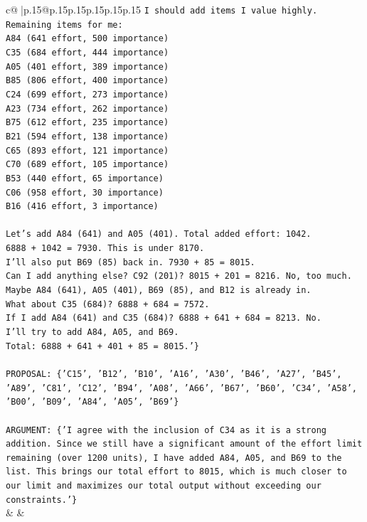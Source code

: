 \documentclass{article}
\begin{document}
{\begin{supertabular}{c@{$\;$}|p{.15\linewidth}@{}p{.15\linewidth}p{.15\linewidth}p{.15\linewidth}p{.15\linewidth}p{.15\linewidth}}
{{{\texttt{I should add items I value highly.} \\
\texttt{Remaining items for me:} \\
\texttt{A84 (641 effort, 500 importance)} \\
\texttt{C35 (684 effort, 444 importance)} \\
\texttt{A05 (401 effort, 389 importance)} \\
\texttt{B85 (806 effort, 400 importance)} \\
\texttt{C24 (699 effort, 273 importance)} \\
\texttt{A23 (734 effort, 262 importance)} \\
\texttt{B75 (612 effort, 235 importance)} \\
\texttt{B21 (594 effort, 138 importance)} \\
\texttt{C65 (893 effort, 121 importance)} \\
\texttt{C70 (689 effort, 105 importance)} \\
\texttt{B53 (440 effort, 65 importance)} \\
\texttt{C06 (958 effort, 30 importance)} \\
\texttt{B16 (416 effort, 3 importance)} \\
\\ 
\texttt{Let's add A84 (641) and A05 (401). Total added effort: 1042.} \\
\texttt{6888 + 1042 = 7930. This is under 8170.} \\
\texttt{I'll also put B69 (85) back in. 7930 + 85 = 8015.} \\
\texttt{Can I add anything else? C92 (201)? 8015 + 201 = 8216. No, too much.} \\
\texttt{Maybe A84 (641), A05 (401), B69 (85), and B12 is already in.} \\
\texttt{What about C35 (684)? 6888 + 684 = 7572.} \\
\texttt{If I add A84 (641) and C35 (684)? 6888 + 641 + 684 = 8213. No.} \\
\texttt{I'll try to add A84, A05, and B69.} \\
\texttt{Total: 6888 + 641 + 401 + 85 = 8015.'\}} \\
\\ 
\texttt{PROPOSAL: \{'C15', 'B12', 'B10', 'A16', 'A30', 'B46', 'A27', 'B45', 'A89', 'C81', 'C12', 'B94', 'A08', 'A66', 'B67', 'B60', 'C34', 'A58', 'B00', 'B09', 'A84', 'A05', 'B69'\}} \\
\\ 
\texttt{ARGUMENT: \{'I agree with the inclusion of C34 as it is a strong addition. Since we still have a significant amount of the effort limit remaining (over 1200 units), I have added A84, A05, and B69 to the list. This brings our total effort to 8015, which is much closer to our limit and maximizes our total output without exceeding our constraints.'\}} \\
            }
        }
    }
    & & \\ \\


\end{supertabular}}
\end{document}
